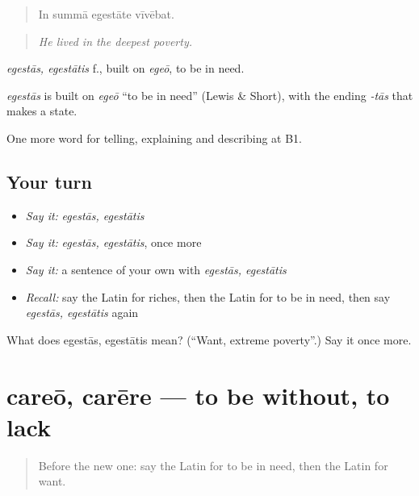 \begin{quote}
In summā egestāte vīvēbat.
\end{quote}

\begin{quote}
\emph{He lived in the deepest poverty.}
\end{quote}

\emph{egestās, egestātis} f., built on \emph{egeō}, to be in need.

\begin{cousinweb}
\emph{egestās} is built on \emph{egeō} \textquotedblleft{}to be in need\textquotedblright{} (Lewis \& Short), with the ending \emph{-tās} that makes a state.
\end{cousinweb}

\begin{grammarlens}[title={What you've built}]
One more word for telling, explaining and describing at B1.
\end{grammarlens}

\subsection*{Your turn}
\begin{itemize}
\raggedright
  \item \emph{Say it:} \emph{egestās, egestātis}
  \item \emph{Say it:} \emph{egestās, egestātis}, once more
  \item \emph{Say it:} a sentence of your own with \emph{egestās, egestātis}
  \item \emph{Recall:} say the Latin for riches, then the Latin for to be in need, then say \emph{egestās, egestātis} again
\end{itemize}

\begin{tcolorbox}[breakable,colback=teal!4,colframe=teal!35!black,title={Before you move on}]
What does egestās, egestātis mean? (\textquotedblleft{}Want, extreme poverty\textquotedblright{}.) Say it once more.
\end{tcolorbox}
\section[careō, carēre]{careō, carēre — to be without, to lack}

\label{lesson:LA-C422-careo}



\begin{quote}
Before the new one: say the Latin for to be in need, then the Latin for want.
\end{quote}

